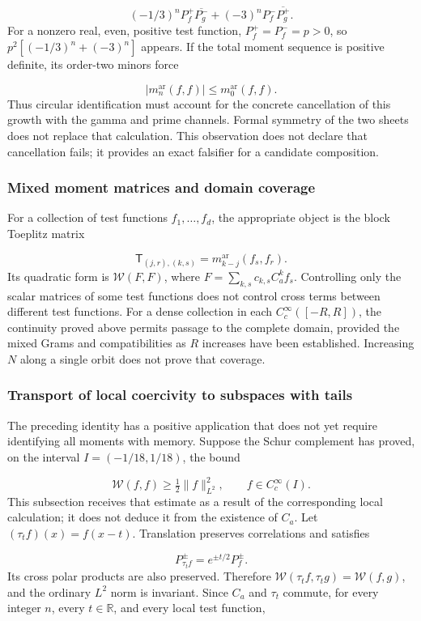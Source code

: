 \[
(-1/3)^nP_f^+\overline{P_g^-}
+(-3)^nP_f^-\overline{P_g^+}.
\]
For a nonzero real, even, positive test function, \(P_f^+=P_f^-=p>0\), so \(p^2[(-1/3)^n+(-3)^n]\) appears. If the total moment sequence is positive definite, its order-two minors force

\[
|m_n^{\mathrm{ar}}(f,f)|\le m_0^{\mathrm{ar}}(f,f).
\]
Thus circular identification must account for the concrete cancellation of this growth with the gamma and prime channels. Formal symmetry of the two sheets does not replace that calculation. This observation does not declare that cancellation fails; it provides an exact falsifier for a candidate composition.


\subsubsection{Mixed moment matrices and domain coverage}
\label{tm-add-m6-2}
For a collection of test functions \(f_1,\ldots,f_d\), the appropriate object is the block Toeplitz matrix

\[
\mathsf T_{(j,r),(k,s)}
=m_{k-j}^{\mathrm{ar}}(f_s,f_r).
\]
Its quadratic form is \(\mathscr W(F,F)\), where \(F=\sum_{k,s}c_{k,s}C_a^k f_s\). Controlling only the scalar matrices of some test functions does not control cross terms between different test functions. For a dense collection in each \(C_c^\infty([-R,R])\), the continuity proved above permits passage to the complete domain, provided the mixed Grams and compatibilities as \(R\) increases have been established. Increasing \(N\) along a single orbit does not prove that coverage.


\subsubsection{Transport of local coercivity to subspaces with tails}
\label{tm-add-m6-3}
\label{tm-add:familias-transportadas}
The preceding identity has a positive application that does not yet require identifying all moments with memory. Suppose the Schur complement has proved, on the interval \(I=(-1/18,1/18)\), the bound

\[
\mathscr W(f,f)\geq\tfrac12\|f\|_{L^2}^2,
\qquad f\in C_c^\infty(I).
\]
This subsection receives that estimate as a result of the corresponding local calculation; it does not deduce it from the existence of \(C_a\). Let \((\tau_t f)(x)=f(x-t)\). Translation preserves correlations and satisfies

\[
P_{\tau_t f}^{\pm}=e^{\pm t/2}P_f^{\pm}.
\]
Its cross polar products are also preserved. Therefore \(\mathscr W(\tau_t f,\tau_t g)=\mathscr W(f,g)\), and the ordinary \(L^2\) norm is invariant. Since \(C_a\) and \(\tau_t\) commute, for every integer \(n\), every \(t\in\mathbb R\), and every local test function,

